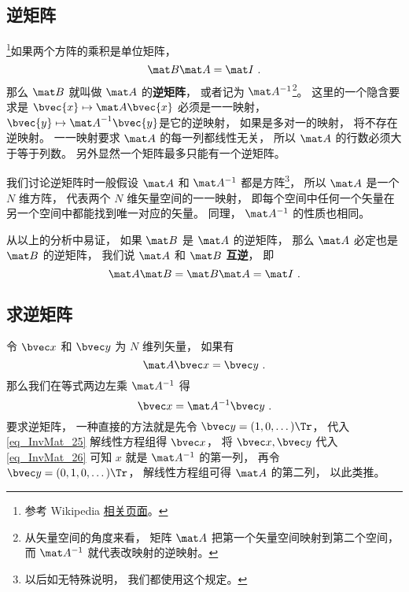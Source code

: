 
\begin{issues}
\issueTODO
\end{issues}


\subsection{逆矩阵}

\footnote{参考 Wikipedia \href{https://en.wikipedia.org/wiki/Invertible_matrix}{相关页面}。}如果两个方阵的乘积是单位矩阵， 
\begin{equation}
\mat B \mat A = \mat I~.
\end{equation}
那么 $\mat B$ 就叫做 $\mat A$ 的\textbf{逆矩阵}， 或者记为 $\mat A^{-1}$\footnote{从矢量空间的角度来看， 矩阵 $\mat A$ 把第一个矢量空间映射到第二个空间， 而 $\mat A^{-1}$ 就代表改映射的逆映射。}。 这里的一个隐含要求是 $\bvec{x} \mapsto \mat A \bvec{x}$ 必须是一一映射，$\bvec{y} \mapsto {\mat A}^{-1} \bvec{y}$是它的逆映射， 如果是多对一的映射， 将不存在逆映射。 一一映射要求 $\mat A$ 的每一列都线性无关，%
所以 $\mat A$ 的行数必须大于等于列数。 另外显然一个矩阵最多只能有一个逆矩阵。

我们讨论逆矩阵时一般假设 $\mat A$ 和 $\mat A^{-1}$ 都是方阵\footnote{以后如无特殊说明， 我们都使用这个规定。}， 所以 $\mat A$ 是一个 $N$ 维方阵， 代表两个 $N$ 维矢量空间的一一映射， 即每个空间中任何一个矢量在另一个空间中都能找到唯一对应的矢量。 同理， $\mat A^{-1}$ 的性质也相同。

从以上的分析中易证， 如果 $\mat B$ 是 $\mat A$ 的逆矩阵， 那么 $\mat A$ 必定也是 $\mat B$ 的逆矩阵， 我们说 $\mat A$ 和 $\mat B$ \textbf{互逆}， 即
\begin{equation}\label{eq_InvMat_2}
\mat A \mat B = \mat B \mat A = \mat I~.
\end{equation}

\subsection{求逆矩阵}
令 $\bvec x$ 和 $\bvec y$ 为 $N$ 维列矢量， 如果有
\begin{equation}\label{eq_InvMat_25}
\mat A \bvec x = \bvec y~.
\end{equation}
那么我们在等式两边左乘 $\mat A^{-1}$ 得
\begin{equation}\label{eq_InvMat_26}
\bvec x = \mat A^{-1} \bvec y~.
\end{equation}
要求逆矩阵， 一种直接的方法就是先令 $\bvec y = (1, 0, \dots)\Tr$， 代入\autoref{eq_InvMat_25} 解线性方程组得 $\bvec x$， 将 $\bvec x, \bvec y$ 代入\autoref{eq_InvMat_26} 可知 $x$ 就是 $\mat A^{-1}$ 的第一列， 再令 $\bvec y = (0, 1, 0, \dots)\Tr$， 解线性方程组可得 $\mat A$ 的第二列， 以此类推。

